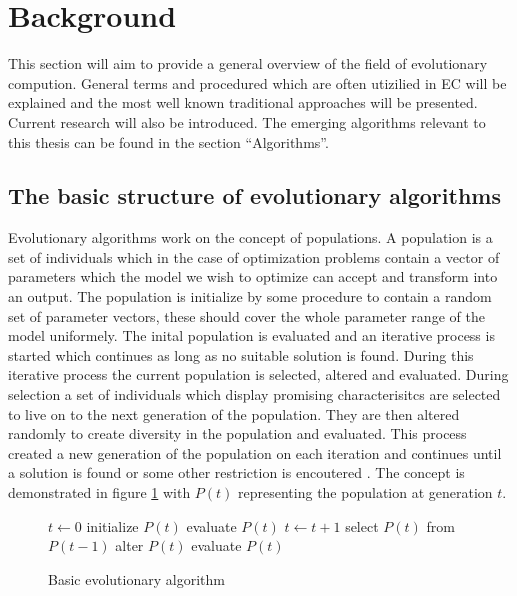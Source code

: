 \section{Background}

This section will aim to provide a general overview of the field of evolutionary compution. General terms and procedured which are often utizilied in EC will be explained and the most well known traditional approaches will be presented. Current research will also be introduced. The emerging algorithms relevant to this thesis can be found in the section ``Algorithms''.

\subsection{The basic structure of evolutionary algorithms}

Evolutionary algorithms work on the concept of populations. A population is a set of individuals which in the case of optimization problems contain a vector of parameters which the model we wish to optimize can accept and transform into an output. The population is initialize by some procedure to contain a random set of parameter vectors, these should cover the whole parameter range of the model uniformely. The inital population is evaluated and an iterative process is started which continues as long as no suitable solution is found. During this iterative process the current population is selected, altered and evaluated. During selection a set of individuals which display promising characterisitcs are selected to live on to the next generation of the population. They are then altered randomly to create diversity in the population and evaluated. This process created a new generation of the population on each iteration and continues until a solution is found or some other restriction is encoutered \cite{Eiben20021}. The concept is demonstrated in figure \ref{algo:basicevolution} with $P(t)$ representing the population at generation $t$.

\begin{figure}[h]
  \centering
  \begin{minipage}{7.5cm}
    \begin{algorithmic}
       \State $t\gets 0$
       \State initialize $P(t)$
       \State evaluate $P(t)$
        \State $t\gets t + 1$
        \State select $P(t)$ from $P(t-1)$
        \State alter $P(t)$
        \State evaluate $P(t)$
       \EndWhile
    \end{algorithmic}
  \end{minipage}
  \caption{Basic evolutionary algorithm}
  \label{algo:basicevolution}
\end{figure}

